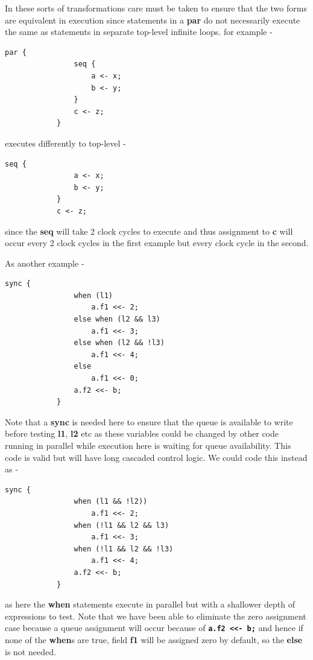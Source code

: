         In these sorts of transformations care must be taken to ensure that the
        two forms are equivalent in execution since statements in a {\bf par} do
        not necessarily execute the same as statements in separate top-level
        infinite loops. for example -
        \begin{lstlisting}[gobble=8, language=threepl]
            par {
                seq {
                    a <- x;
                    b <- y;
                }
                c <- z;
            }
        \end{lstlisting}
        executes differently to top-level -
        \begin{lstlisting}[gobble=8, language=threepl]
            seq {
                a <- x;
                b <- y;
            }
            c <- z;
        \end{lstlisting}
        since the {\bf seq} will take 2 clock cycles to execute and thus
        assignment to {\bf c} will occur every 2 clock cycles in the first
        example but every clock cycle in the second.
        
        As another example -
        \begin{lstlisting}[gobble=8, language=threepl]
            sync {
                when (l1)
                    a.f1 <<- 2;
                else when (l2 && l3)
                    a.f1 <<- 3;
                else when (l2 && !l3)
                    a.f1 <<- 4;
                else
                    a.f1 <<- 0;
                a.f2 <<- b;
            }
        \end{lstlisting}
        Note that a {\bf sync} is needed here to ensure that the queue is
        available to write before testing {\bf l1}, {\bf l2} etc as these
        variables could be changed by other code running in parallel while
        execution here is waiting for queue availability. This code is valid but
        will have long cascaded control logic. We could code this instead as -
        \begin{lstlisting}[gobble=8, language=threepl]
            sync {           
                when (l1 && !l2))
                    a.f1 <<- 2;
                when (!l1 && l2 && l3)
                    a.f1 <<- 3;
                when (!l1 && l2 && !l3)
                    a.f1 <<- 4;
                a.f2 <<- b;
            }
        \end{lstlisting}
        as here the {\bf when} statements execute in parallel but with a
        shallower depth of expressions to test. Note that we have been able to
        eliminate the zero assignment case because a queue assignment will occur
        because of {\bf \verb'a.f2 <<- b;'} and hence if none of the {\bf when}s
        are true, field {\bf f1} will be assigned zero by default, so the {\bf
        else} is not needed.
        
